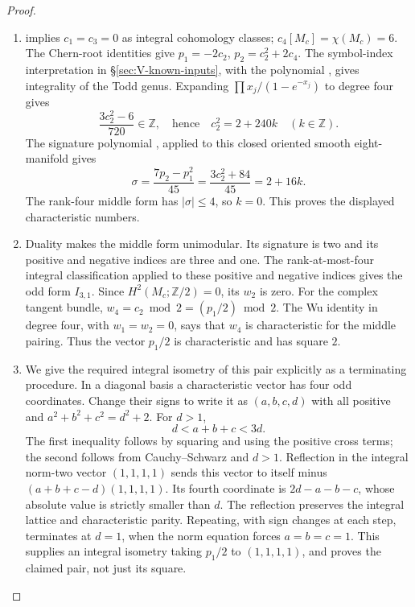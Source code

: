 \begin{proof}
\begin{enumerate}[label={$\langle1\rangle$\arabic*.}]
\item {} implies $c_1=c_3=0$ as integral cohomology classes;
$c_4[M_c]=\chi(M_c)=6$.  The Chern-root identities give
$p_1=-2c_2$, $p_2=c_2^2+2c_4$.
The symbol-index interpretation in \S\ref{sec:V-known-inputs},
with the polynomial \cite[equation (1.2), p.~3]{ffEsoleKang},
gives integrality of the Todd genus. Expanding
$\prod x_j/(1-e^{-x_j})$ to degree four gives
\[
\frac{3c_2^2-6}{720}\in\mathbb Z,
\quad\text{hence}\quad c_2^2=2+240k\quad(k\in\mathbb Z).
\]
The signature polynomial \cite[equation (1.4), p.~4]{ffEsoleKang}, applied to
this closed oriented smooth eight-manifold gives
\[
\sigma=\frac{7p_2-p_1^2}{45}
      =\frac{3c_2^2+84}{45}=2+16k.
\]
The rank-four middle form has $|\sigma|\leq4$, so $k=0$.
This proves the displayed characteristic numbers.

\item Duality makes the middle form unimodular.  Its signature is two and
its positive and negative indices are three and one.  The rank-at-most-four integral classification
\cite[Theorem 2.2.1, p.~61]{ffPetersSterk} applied to these
positive and negative indices gives the odd form \(I_{3,1}\).
Since $H^2(M_c;\mathbb Z/2)=0$, its $w_2$ is zero.
For the complex tangent bundle,
$w_4=c_2\bmod2=(p_1/2)\bmod2$.
The Wu identity in degree four, with $w_1=w_2=0$, says that $w_4$ is
characteristic for the middle pairing.  Thus the vector $p_1/2$ is
characteristic and has square $2$.

\item We give the required integral isometry of this pair explicitly as
a terminating procedure.  In a diagonal basis a characteristic vector
has four odd coordinates.  Change their signs to write it as
$(a,b,c,d)$ with all positive and
$a^2+b^2+c^2=d^2+2$.
For $d>1$,
\[
d<a+b+c<3d.
\]
The first inequality follows by squaring and using the positive cross
terms; the second follows from Cauchy--Schwarz and $d>1$.
Reflection in the integral norm-two vector $(1,1,1,1)$ sends this
vector to itself minus $(a+b+c-d)(1,1,1,1)$.
Its fourth coordinate is $2d-a-b-c$, whose absolute value is strictly
smaller than $d$.  The reflection preserves the integral lattice and
characteristic parity.  Repeating, with sign changes at each step,
terminates at $d=1$, when the norm equation forces $a=b=c=1$.
This supplies an integral isometry taking $p_1/2$ to $(1,1,1,1)$,
and proves the claimed pair, not just its square.

\end{enumerate}
\end{proof}




